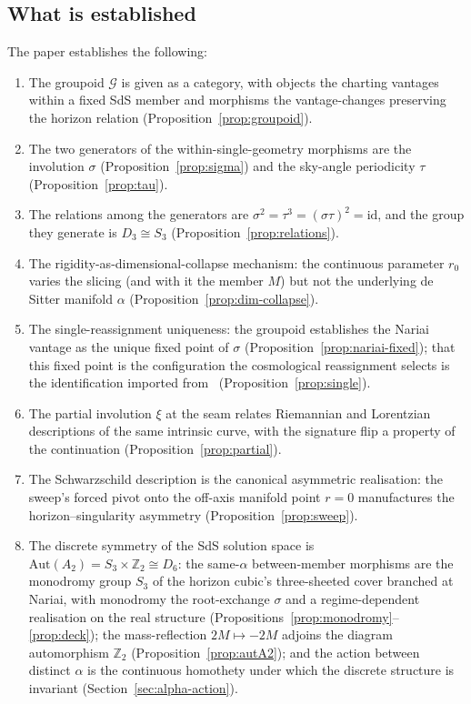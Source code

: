 \documentclass[11pt,a4paper]{article}
\theoremstyle{definition}
\begin{document}
\subsection{What is established}\label{sec:established}

The paper establishes the following:

\begin{enumerate}
\item The groupoid $\mathcal{G}$ is given as a category, with objects the charting vantages within a fixed SdS member and morphisms the vantage-changes preserving the horizon relation (Proposition~\ref{prop:groupoid}).

\item The two generators of the within-single-geometry morphisms are the involution $\sigma$ (Proposition~\ref{prop:sigma}) and the sky-angle periodicity $\tau$ (Proposition~\ref{prop:tau}).

\item The relations among the generators are $\sigma^{2}=\tau^{3}=(\sigma\tau)^{2}=\text{id}$, and the group they generate is $D_{3}\cong S_{3}$ (Proposition~\ref{prop:relations}).

\item The rigidity-as-dimensional-collapse mechanism: the continuous parameter $r_{0}$ varies the slicing (and with it the member $M$) but not the underlying de Sitter manifold $\alpha$ (Proposition~\ref{prop:dim-collapse}).

\item The single-reassignment uniqueness: the groupoid establishes the Nariai vantage as the unique fixed point of $\sigma$ (Proposition~\ref{prop:nariai-fixed}); that this fixed point is the configuration the cosmological reassignment selects is the identification imported from~\cite{JanzenCRframework} (Proposition~\ref{prop:single}).

\item The partial involution $\xi$ at the seam relates Riemannian and Lorentzian descriptions of the same intrinsic curve, with the signature flip a property of the continuation (Proposition~\ref{prop:partial}).

\item The Schwarzschild description is the canonical asymmetric realisation: the sweep's forced pivot onto the off-axis manifold point $r=0$ manufactures the horizon--singularity asymmetry (Proposition~\ref{prop:sweep}).

\item The discrete symmetry of the SdS solution space is $\mathrm{Aut}(A_{2})=S_{3}\times\mathbb{Z}_{2}\cong D_{6}$: the same-$\alpha$ between-member morphisms are the monodromy group $S_{3}$ of the horizon cubic's three-sheeted cover branched at Nariai, with monodromy the root-exchange $\sigma$ and a regime-dependent realisation on the real structure (Propositions~\ref{prop:monodromy}--\ref{prop:deck}); the mass-reflection $2M\mapsto-2M$ adjoins the diagram automorphism $\mathbb{Z}_{2}$ (Proposition~\ref{prop:autA2}); and the action between distinct $\alpha$ is the continuous homothety under which the discrete structure is invariant (Section~\ref{sec:alpha-action}).
\end{enumerate}
\end{document}
